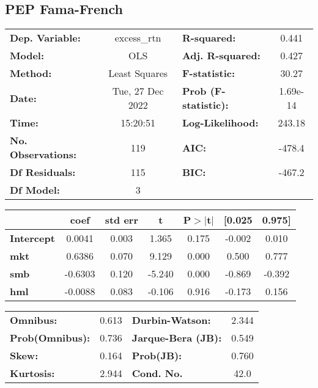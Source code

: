 \documentclass{report}
\begin{document}
\subsection{PEP Fama-French}

\begin{center}
\begin{tabular}{lclc}
\toprule
\textbf{Dep. Variable:}    &   excess\_rtn    & \textbf{  R-squared:         } &     0.441   \\
\textbf{Model:}            &       OLS        & \textbf{  Adj. R-squared:    } &     0.427   \\
\textbf{Method:}           &  Least Squares   & \textbf{  F-statistic:       } &     30.27   \\
\textbf{Date:}             & Tue, 27 Dec 2022 & \textbf{  Prob (F-statistic):} &  1.69e-14   \\
\textbf{Time:}             &     15:20:51     & \textbf{  Log-Likelihood:    } &    243.18   \\
\textbf{No. Observations:} &         119      & \textbf{  AIC:               } &    -478.4   \\
\textbf{Df Residuals:}     &         115      & \textbf{  BIC:               } &    -467.2   \\
\textbf{Df Model:}         &           3      & \textbf{                     } &             \\
\bottomrule
\end{tabular}
\begin{tabular}{lcccccc}
                   & \textbf{coef} & \textbf{std err} & \textbf{t} & \textbf{P$> |$t$|$} & \textbf{[0.025} & \textbf{0.975]}  \\
\midrule
\textbf{Intercept} &       0.0041  &        0.003     &     1.365  &         0.175        &       -0.002    &        0.010     \\
\textbf{mkt}       &       0.6386  &        0.070     &     9.129  &         0.000        &        0.500    &        0.777     \\
\textbf{smb}       &      -0.6303  &        0.120     &    -5.240  &         0.000        &       -0.869    &       -0.392     \\
\textbf{hml}       &      -0.0088  &        0.083     &    -0.106  &         0.916        &       -0.173    &        0.156     \\
\bottomrule
\end{tabular}
\begin{tabular}{lclc}
\textbf{Omnibus:}       &  0.613 & \textbf{  Durbin-Watson:     } &    2.344  \\
\textbf{Prob(Omnibus):} &  0.736 & \textbf{  Jarque-Bera (JB):  } &    0.549  \\
\textbf{Skew:}          &  0.164 & \textbf{  Prob(JB):          } &    0.760  \\
\textbf{Kurtosis:}      &  2.944 & \textbf{  Cond. No.          } &     42.0  \\
\bottomrule
\end{tabular}
\end{center}
\end{document}
